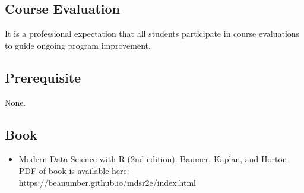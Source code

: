 \documentclass{article}\usepackage[]{graphicx}\usepackage[]{color}
\begin{document}
\subsection*{Course Evaluation}
It is a professional expectation that all students participate in course evaluations to guide ongoing program improvement.

\subsection*{Prerequisite}
None.  

\subsection*{Book}
\begin{itemize}
\item Modern Data Science with R (2nd edition). Baumer, Kaplan, and Horton  \\
PDF of book is available here: https://beanumber.github.io/mdsr2e/index.html
\\
\end{itemize}
\end{document}
